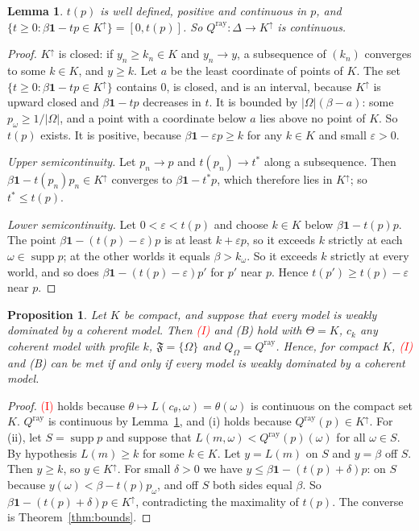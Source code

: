 \documentclass[11pt]{article}
\newtheorem{lemma}[theorem]{Lemma}
\newtheorem{proposition}[theorem]{Proposition}
\theoremstyle{definition}
\theoremstyle{remark}
\newcommand{\F}{\mathfrak F}
\newcommand{\one}{\mathbf 1}
\newcommand{\supp}{\operatorname{supp}}
\begin{document}
\begin{lemma}\label{lem:ray}
$t(p)$ is well defined, positive and continuous in $p$, and $\{t\ge0:\beta\one-tp\in K^\uparrow\}=[0,t(p)]$. So $Q^{\mathrm{ray}}:\Delta\to K^\uparrow$ is continuous.
\end{lemma}
\begin{proof}
$K^\uparrow$ is closed: if $y_n\ge k_n\in K$ and $y_n\to y$, a subsequence of $(k_n)$ converges to some $k\in K$, and $y\ge k$. Let $a$ be the least coordinate of points of $K$. The set $\{t\ge0:\beta\one-tp\in K^\uparrow\}$ contains $0$, is closed, and is an interval, because $K^\uparrow$ is upward closed and $\beta\one-tp$ decreases in $t$. It is bounded by $|\Omega|(\beta-a)$: some $p_\omega\ge1/|\Omega|$, and a point with a coordinate below $a$ lies above no point of $K$. So $t(p)$ exists. It is positive, because $\beta\one-\varepsilon p\ge k$ for any $k\in K$ and small $\varepsilon>0$.

\emph{Upper semicontinuity.} Let $p_n\to p$ and $t(p_n)\to t^*$ along a subsequence. Then $\beta\one-t(p_n)p_n\in K^\uparrow$ converges to $\beta\one-t^*p$, which therefore lies in $K^\uparrow$; so $t^*\le t(p)$.

\emph{Lower semicontinuity.} Let $0<\varepsilon<t(p)$ and choose $k\in K$ below $\beta\one-t(p)p$. The point $\beta\one-(t(p)-\varepsilon)p$ is at least $k+\varepsilon p$, so it exceeds $k$ strictly at each $\omega\in\supp p$; at the other worlds it equals $\beta>k_\omega$. So it exceeds $k$ strictly at every world, and so does $\beta\one-(t(p)-\varepsilon)p'$ for $p'$ near $p$. Hence $t(p')\ge t(p)-\varepsilon$ near $p$.
\end{proof}

\begin{proposition}\label{prop:necessary}
Let $K$ be compact, and suppose that every model is weakly dominated by a coherent model. Then \textcolor{red}{(I)} and (B) hold with $\Theta=K$, $c_k$ any coherent model with profile $k$, $\F=\{\Omega\}$ and $Q_\Omega=Q^{\mathrm{ray}}$. Hence, for compact $K$, \textcolor{red}{(I)} and (B) can be met if and only if every model is weakly dominated by a coherent model.
\end{proposition}
\begin{proof}
\textcolor{red}{(I)} holds because $\theta\mapsto L(c_\theta,\omega)=\theta(\omega)$ is continuous on the compact set $K$. $Q^{\mathrm{ray}}$ is continuous by Lemma~\ref{lem:ray}, and (i) holds because $Q^{\mathrm{ray}}(p)\in K^\uparrow$. For (ii), let $S=\supp p$ and suppose that $L(m,\omega)<Q^{\mathrm{ray}}(p)(\omega)$ for all $\omega\in S$. By hypothesis $L(m)\ge k$ for some $k\in K$. Let $y=L(m)$ on $S$ and $y=\beta$ off $S$. Then $y\ge k$, so $y\in K^\uparrow$. For small $\delta>0$ we have $y\le \beta\one-(t(p)+\delta)p$: on $S$ because $y(\omega)<\beta-t(p)p_\omega$, and off $S$ both sides equal $\beta$. So $\beta\one-(t(p)+\delta)p\in K^\uparrow$, contradicting the maximality of $t(p)$. The converse is Theorem~\ref{thm:bounds}.
\end{proof}
\end{document}
